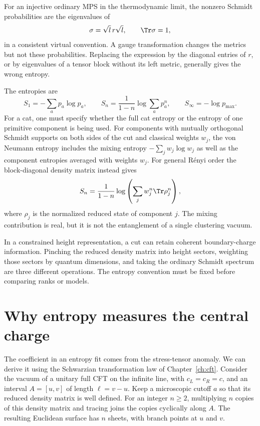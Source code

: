 For an injective ordinary MPS in the thermodynamic limit, the nonzero
Schmidt probabilities are the eigenvalues of
\[
 \sigma=\sqrt l\,r\sqrt l,
 \qquad\Tr\sigma=1,
\]
in a consistent virtual convention. A gauge transformation changes
the metrics but not these probabilities. Replacing the expression by
the diagonal entries of $r$, or by eigenvalues of a tensor block
without its left metric, generally gives the wrong entropy.

The entropies are
\[
 S_1=-\sum_ap_a\log p_a,\qquad
 S_n=\frac1{1-n}\log\sum_ap_a^n,
 \qquad S_\infty=-\log p_{\max}.
\]
For a cat, one must specify whether the full cat entropy or the
entropy of one primitive component is being used. For components with
mutually orthogonal Schmidt supports on both sides of the cut and
classical weights $w_j$, the von Neumann entropy includes
the mixing entropy $-\sum_jw_j\log w_j$ as well as the component
entropies averaged with weights $w_j$. For general R\'enyi order the
block-diagonal density matrix instead gives
\[
 S_n=\frac1{1-n}\log\left(\sum_jw_j^n\Tr\rho_j^n\right),
\]
where $\rho_j$ is the normalized reduced state of component $j$.
The mixing contribution is real, but it is not the entanglement
of a single clustering vacuum.

In a constrained height representation, a cut can retain coherent
boundary-charge information. Pinching the reduced density matrix into
height sectors, weighting those sectors by quantum dimensions, and
taking the ordinary Schmidt spectrum are three different operations.
The entropy convention must be fixed before comparing ranks or models.

\section{Why entropy measures the central charge}
\label{sec:MPS-replica}

The coefficient in an entropy fit comes from the stress-tensor anomaly.
We can derive it using the Schwarzian transformation law of
Chapter~\ref{ch:cft}. Consider the vacuum of a unitary full CFT on the
infinite line, with $c_L=c_R=c$, and an interval $A=[u,v]$ of length
$\ell=v-u$. Keep a microscopic cutoff $a$ so that its reduced density
matrix is well defined. For an integer $n\geq2$, multiplying $n$ copies
of this density matrix and tracing joins the copies cyclically along
$A$. The resulting Euclidean surface has $n$ sheets, with branch
points at $u$ and $v$.

